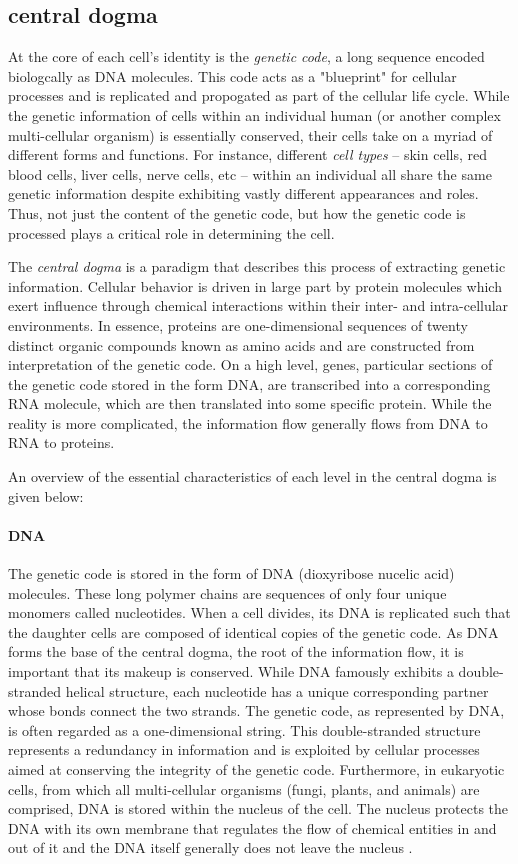 \subsection{central dogma}
At the core of each cell's identity is the \emph{genetic code}, a long sequence encoded biologcally as DNA molecules.
This code acts as a "blueprint" for cellular processes and
is replicated and propogated as part of the cellular life cycle.
While the genetic information of cells within an individual human (or another complex multi-cellular organism) is essentially conserved, their cells take on a myriad of different forms and functions.
For instance, different \emph{cell types} -- skin cells, red blood cells, liver cells, nerve cells, etc -- within an individual all share the same genetic information despite exhibiting vastly different appearances and roles.
Thus, not just the content of the genetic code, but how the genetic code is processed plays a critical role in determining the cell.

The \emph{central dogma} is a paradigm that describes this process of extracting genetic information.
Cellular behavior is driven in large part by protein molecules which exert influence through chemical interactions within their inter- and intra-cellular environments.
In essence, proteins are one-dimensional sequences of twenty distinct organic compounds known as amino acids and are constructed from interpretation of the genetic code.
On a high level, genes, particular sections of the genetic code stored in the form DNA, are transcribed into a corresponding RNA molecule, which are then translated into some specific protein.
While the reality is more complicated, the information flow generally flows from DNA to RNA to proteins.

An overview of the essential characteristics of each level in the central dogma is given below:

\paragraph{DNA} The genetic code is stored in the form of DNA (dioxyribose nucelic acid) molecules.
These long polymer chains are sequences of only four unique monomers called nucleotides.
When a cell divides, its DNA is replicated such that the daughter cells are composed of identical copies of the genetic code.
As DNA forms the base of the central dogma, the root of the information flow, it is important that its makeup is conserved.
While DNA famously exhibits a double-stranded helical structure,
each nucleotide has a unique corresponding partner whose bonds connect the two strands.
The genetic code, as represented by DNA, is often regarded as a one-dimensional string.
This double-stranded structure represents a redundancy in information and is exploited by cellular processes aimed at conserving the integrity of the genetic code.
Furthermore, in eukaryotic cells, from which all multi-cellular organisms (fungi, plants, and animals) are comprised, DNA is stored within the nucleus of the cell.
The nucleus protects the DNA with its own membrane that regulates the flow of chemical entities in and out of it and the DNA itself generally does not leave the nucleus \cite{milo2015}.

